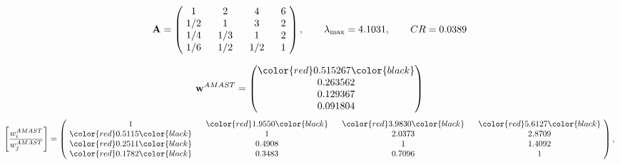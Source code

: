 \begin{example}
\begin{equation*}
\mathbf{A} =
\begin{pmatrix}
$\,\,$ 1 $\,\,$ & $\,\,$2$\,\,$ & $\,\,$4$\,\,$ & $\,\,$6 $\,\,$ \\
$\,\,$ 1/2$\,\,$ & $\,\,$ 1 $\,\,$ & $\,\,$3$\,\,$ & $\,\,$2 $\,\,$ \\
$\,\,$ 1/4$\,\,$ & $\,\,$ 1/3$\,\,$ & $\,\,$ 1 $\,\,$ & $\,\,$2 $\,\,$ \\
$\,\,$ 1/6$\,\,$ & $\,\,$ 1/2$\,\,$ & $\,\,$ 1/2$\,\,$ & $\,\,$ 1  $\,\,$ \\
\end{pmatrix},
\qquad
\lambda_{\max} =
4.1031,
\qquad
CR = 0.0389
\end{equation*}

\begin{equation*}
\mathbf{w}^{AMAST} =
\begin{pmatrix}
\color{red} 0.515267\color{black} \\
0.263562\\
0.129367\\
0.091804
\end{pmatrix}\end{equation*}
\begin{equation*}
\left[ \frac{{w}^{AMAST}_i}{{w}^{AMAST}_j} \right] =
\begin{pmatrix}
$\,\,$ 1 $\,\,$ & $\,\,$\color{red} 1.9550\color{black} $\,\,$ & $\,\,$\color{red} 3.9830\color{black} $\,\,$ & $\,\,$\color{red} 5.6127\color{black} $\,\,$ \\
$\,\,$\color{red} 0.5115\color{black} $\,\,$ & $\,\,$ 1 $\,\,$ & $\,\,$2.0373$\,\,$ & $\,\,$2.8709  $\,\,$ \\
$\,\,$\color{red} 0.2511\color{black} $\,\,$ & $\,\,$0.4908$\,\,$ & $\,\,$ 1 $\,\,$ & $\,\,$1.4092 $\,\,$ \\
$\,\,$\color{red} 0.1782\color{black} $\,\,$ & $\,\,$0.3483$\,\,$ & $\,\,$0.7096$\,\,$ & $\,\,$ 1  $\,\,$ \\
\end{pmatrix},
\end{equation*}


\end{example}
